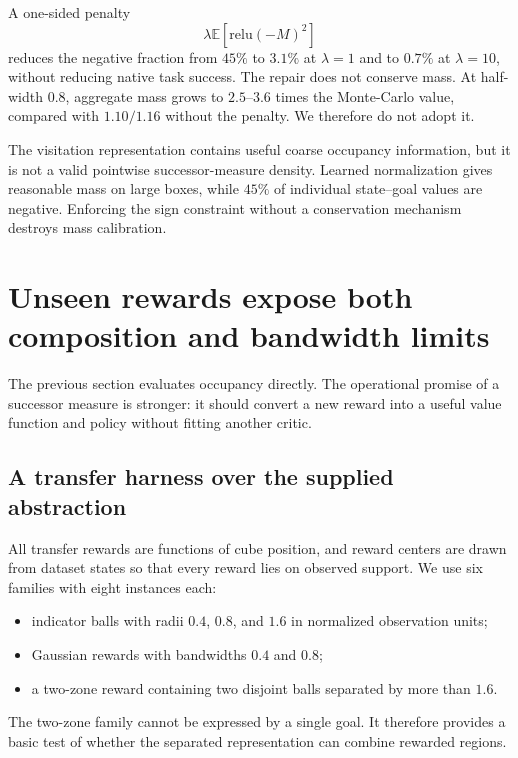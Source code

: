 \documentclass{article}
\newcommand{\E}{\mathbb{E}}
\begin{document}
A one-sided penalty
\begin{equation}
\lambda\E\left[\mathrm{relu}(-M)^2\right]
\end{equation}
reduces the negative fraction from $45\%$ to $3.1\%$ at $\lambda=1$ and to $0.7\%$
at $\lambda=10$, without reducing native task success. The repair does not
conserve mass. At half-width $0.8$, aggregate mass grows to $2.5$--$3.6$ times the
Monte-Carlo value, compared with $1.10/1.16$ without the penalty. We therefore do
not adopt it.

\begin{finding}
The visitation representation contains useful coarse occupancy information, but
it is not a valid pointwise successor-measure density. Learned normalization gives
reasonable mass on large boxes, while $45\%$ of individual state--goal values are
negative. Enforcing the sign constraint without a conservation mechanism destroys
mass calibration.
\end{finding}

\section{Unseen rewards expose both composition and bandwidth limits}
\label{sec:reward-transfer}

The previous section evaluates occupancy directly. The operational promise of a
successor measure is stronger: it should convert a new reward into a useful value
function and policy without fitting another critic.

\subsection{A transfer harness over the supplied abstraction}

All transfer rewards are functions of cube position, and reward centers are drawn
from dataset states so that every reward lies on observed support. We use six
families with eight instances each:
\begin{itemize}
    \item indicator balls with radii $0.4$, $0.8$, and $1.6$ in normalized
    observation units;
    \item Gaussian rewards with bandwidths $0.4$ and $0.8$;
    \item a two-zone reward containing two disjoint balls separated by more than
    $1.6$.
\end{itemize}
The two-zone family cannot be expressed by a single goal. It therefore provides a
basic test of whether the separated representation can combine rewarded regions.
\end{document}
